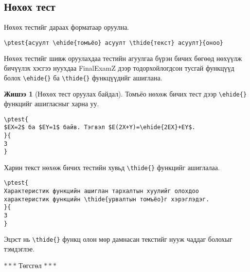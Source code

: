\documentclass[10pt]{article}
\theoremstyle{definition}
\newtheorem{example}{Жишээ}
\begin{document}
\subsection{Нөхөх тест}

Нөхөх тестийг дараах форматаар оруулна.
\begin{verbatim}
\ptest{асуулт \ehide{томъёо} асуулт \thide{текст} асуулт}{оноо}
\end{verbatim}
Нөхөх тестийг шивж оруулахдаа тестийн агуулгаа бүрэн бичих бөгөөд нөхүүлж бичүүлэх хэсгээ нуухдаа FinalExamZ дээр тодорхойлогдсон тусгай функцүүд болох \verb|\ehide{}| ба \verb|\thide{}| функцүүдийг ашиглана.

\begin{example}[Нөхөх тест оруулах байдал]
Томъёо нөхөж бичих тест дээр \verb|\ehide{}| функцийг ашигласныг харна уу.
\begin{verbatim}
\ptest{
$EX=2$ ба $EY=1$ байв. Тэгвэл $E(2X+Y)=\ehide{2EX}+EY$.
}{
3
}
\end{verbatim}
Харин текст нөхөж бичих тестийн хувьд \verb|\thide{}| функцийг ашиглалаа.
\begin{verbatim}
\ptest{
Характеристик функцийн ашиглан тархалтын хуулийг олохдоо 
характеристик функцийн \thide{урвалтын томъёо}г хэрэглэдэг.
}{
3
}
\end{verbatim}
\end{example}

Эцэст нь \verb|\thide{}| функц олон мөр дамнасан текстийг нууж чаддаг болохыг тэмдэглэе.

\begin{center}
 $\ast\ast\ast$ Төгсгөл $\ast\ast\ast$
\end{center}
\end{document}
